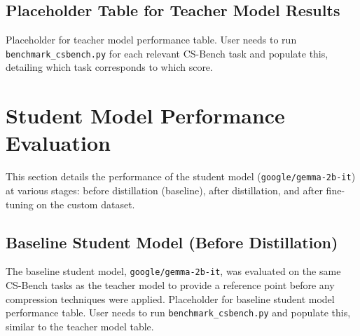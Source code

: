 \documentclass[12pt, a4paper]{report}
\begin{document}
\subsection{Placeholder Table for Teacher Model Results}
\noindent Placeholder for teacher model performance table. User needs to run \texttt{benchmark\_csbench.py} for each relevant CS-Bench task and populate this, detailing which task corresponds to which score.

\section{Student Model Performance Evaluation}
\label{sec:student_performance}
This section details the performance of the student model (\texttt{google/gemma-2b-it}) at various stages: before distillation (baseline), after distillation, and after fine-tuning on the custom dataset.

\subsection{Baseline Student Model (Before Distillation)}
\label{ssec:student_baseline}
The baseline student model, \texttt{google/gemma-2b-it}, was evaluated on the same CS-Bench tasks as the teacher model to provide a reference point before any compression techniques were applied.
\noindent Placeholder for baseline student model performance table. User needs to run \texttt{benchmark\_csbench.py} and populate this, similar to the teacher model table.
\end{document}
